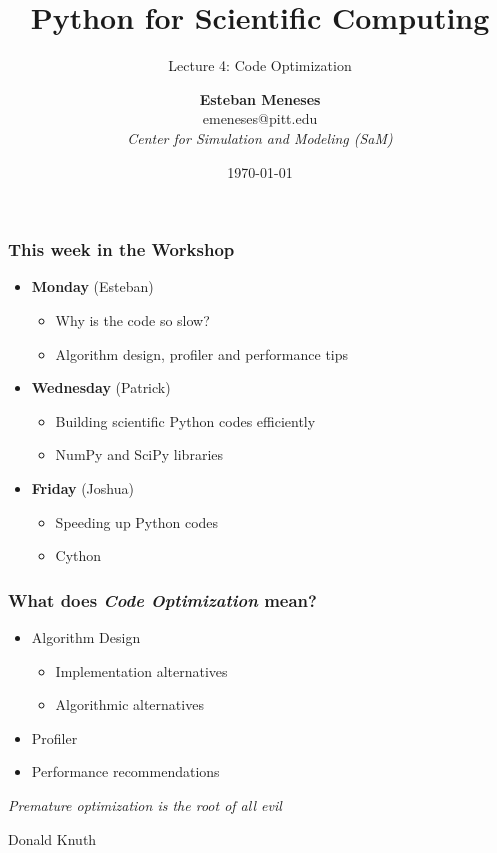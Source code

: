 \documentclass[xcolor=table,10pt,final]{beamer}
\def \audience {}
\begin{document}
\lstset{language=Python}

\title{Python for Scientific Computing}
\subtitle{Lecture 4: Code Optimization}
\author{{\bf Esteban Meneses}\\emeneses@pitt.edu\\{\em Center for Simulation and Modeling (SaM)}}
\date{\today}
\frame{\titlepage}

\ifx \audience \undefined
\begin{frame}
	\frametitle{This week in the Workshop}
	\begin{itemize}
		\item {\bf Monday} (Esteban)
		\begin{itemize} 
			\item Why is the code so slow?
			\item Algorithm design, profiler and performance tips
		\end{itemize}
		\item {\bf Wednesday} (Patrick)
		\begin{itemize} 
			\item Building scientific Python codes efficiently 
			\item NumPy and SciPy libraries
		\end{itemize}
		\item {\bf Friday} (Joshua)
		\begin{itemize} 
			\item Speeding up Python codes
			\item Cython
		\end{itemize}
	\end{itemize}
\end{frame}
\else
\fi

\begin{frame}
	\frametitle{What does \emph{Code Optimization} mean?}
	\begin{itemize}
		\item Algorithm Design
		\begin{itemize}
			\item Implementation alternatives
			\item Algorithmic alternatives
		\end{itemize}
		\item Profiler
		\item Performance recommendations
	\end{itemize}
\end{frame}

\begin{frame}
\hfill \emph{Premature optimization is the root of all evil}

\hfill Donald Knuth
\end{frame}
\end{document}
